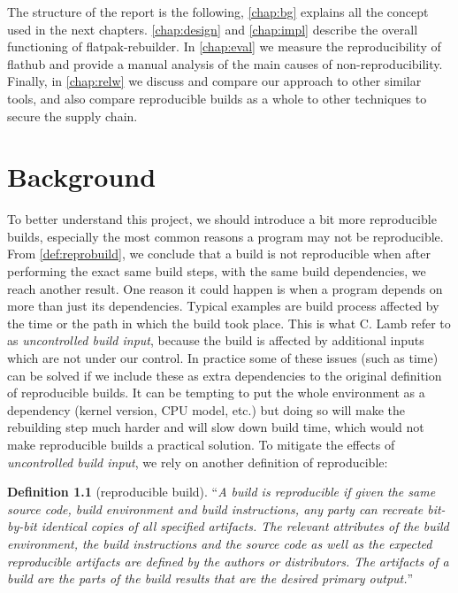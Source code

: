 \documentclass[a4paper,11pt,oneside]{report}
\theoremstyle{definition}
\newtheorem{definition}{Definition}[section]
\newcommand{\sysname}{flatpak-rebuilder\xspace}
\newcommand{\rb}{reproducible builds\xspace}
\newcommand{\fh}{flathub\xspace}
\begin{document}
The structure of the report is the following, \autoref{chap:bg} explains all
the concept used in the next chapters. \autoref{chap:design} and
\autoref{chap:impl} describe the overall functioning of \sysname. In
\autoref{chap:eval} we measure the reproducibility of \fh and provide a manual
analysis of the main causes of non-reproducibility. Finally, in
\autoref{chap:relw} we discuss and compare our approach to other similar tools,
and also compare \rb as a whole to other techniques to secure the supply chain.

\chapter{Background}
\label{chap:bg}

To better understand this project, we should introduce a bit more \rb,
especially the most common reasons a program may not be reproducible. From
\autoref{def:reprobuild}, we conclude that a build is not reproducible when
after performing the exact same build steps, with the same build dependencies,
we reach another result. One reason it could happen is when a program depends
on more than just its dependencies. Typical examples are build process affected
by the time or the path in which the build took place. This is what C. Lamb
refer to as \emph{uncontrolled build input}, because the build is affected by
additional inputs which are not under our control. In practice some of these
issues (such as time) can be solved if we include these as extra dependencies
to the original definition of \rb. It can be tempting to put the whole
environment as a dependency (kernel version, CPU model, etc.) but doing so will
make the rebuilding step much harder and will slow down build time, which would
not make \rb a practical solution. To mitigate the effects of
\emph{uncontrolled build input}, we rely on another definition of reproducible:
\begin{definition}[reproducible build]
\label{def:reprobuild2}
``\emph{A build is reproducible if given the same source code, build
    environment and build instructions, any party can recreate bit-by-bit
    identical copies of all specified artifacts.
The relevant attributes of the build environment, the build instructions and
    the source code as well as the expected reproducible artifacts are defined
    by the authors or distributors. The artifacts of a build are the parts of
    the build results that are the desired primary output.}''~\cite{reprobuilds:def}
\end{definition}
\end{document}
